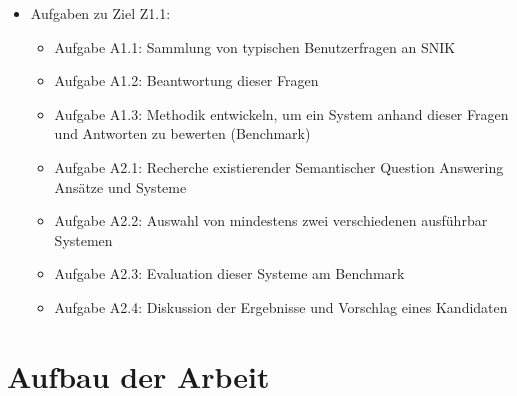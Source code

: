 \begin{itemize}
\item Aufgaben zu Ziel Z1.1:
	\begin{itemize}
	\item Aufgabe A1.1: Sammlung von typischen Benutzerfragen an SNIK
	\item Aufgabe A1.2: Beantwortung dieser Fragen
	\item Aufgabe A1.3: Methodik entwickeln, um ein System anhand dieser Fragen und Antworten zu bewerten (Benchmark)
	\item Aufgabe A2.1: Recherche existierender Semantischer Question Answering Ansätze und Systeme
	\item Aufgabe A2.2: Auswahl von mindestens zwei verschiedenen ausführbar Systemen
	\item Aufgabe A2.3: Evaluation dieser Systeme am Benchmark
	\item Aufgabe A2.4: Diskussion der Ergebnisse und Vorschlag eines Kandidaten
	\end{itemize}
\end{itemize}

\section{Aufbau der Arbeit}
